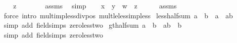\begin{isabellebody}
\ \ \isamarkupfalse%
\ {\isachardoublequoteopen}z\ {\isachargreater}{\kern0pt}\ {}{\isachardoublequoteclose}\isanewline
\ \ \ \ \isamarkupfalse%
\ assms\ \isamarkupfalse%
\ simp\isanewline
\ \ \isamarkupfalse%
\ {\isachardoublequoteopen}x\ {\isacharless}{\kern0pt}\ y\ {\isacharslash}{\kern0pt}\ w\ {\isacharasterisk}{\kern0pt}\ z{\isachardoublequoteclose}\isanewline
\ \ \ \ \isamarkupfalse%
\ assms\ \isamarkupfalse%
\ {\isacharparenleft}{\kern0pt}force\ intro{\isacharcolon}{\kern0pt}\ mult{\isacharunderscore}{\kern0pt}imp{\isacharunderscore}{\kern0pt}less{\isacharunderscore}{\kern0pt}div{\isacharunderscore}{\kern0pt}pos\ mult{\isacharunderscore}{\kern0pt}le{\isacharunderscore}{\kern0pt}less{\isacharunderscore}{\kern0pt}imp{\isacharunderscore}{\kern0pt}less{\isacharparenright}{\kern0pt}\isanewline
{}\isamarkupfalse%
%
\endisatagproof
{\isafoldproof}%
%
\isadelimproof
\isanewline
%
\endisadelimproof
\isanewline
{}\isamarkupfalse%
\ less{\isacharunderscore}{\kern0pt}half{\isacharunderscore}{\kern0pt}sum{\isacharcolon}{\kern0pt}\ {\isachardoublequoteopen}a\ {\isacharless}{\kern0pt}\ b\ {\isasymLongrightarrow}\ a\ {\isacharless}{\kern0pt}\ {\isacharparenleft}{\kern0pt}a{\isacharplus}{\kern0pt}b{\isacharparenright}{\kern0pt}\ {\isacharslash}{\kern0pt}\ {\isacharparenleft}{\kern0pt}{}{\isacharplus}{\kern0pt}{}{\isacharparenright}{\kern0pt}{\isachardoublequoteclose}\isanewline
%
\isadelimproof
\ \ %
\endisadelimproof
%
\isatagproof
{}\isamarkupfalse%
\ {\isacharparenleft}{\kern0pt}simp\ add{\isacharcolon}{\kern0pt}\ field{\isacharunderscore}{\kern0pt}simps\ zero{\isacharunderscore}{\kern0pt}less{\isacharunderscore}{\kern0pt}two{\isacharparenright}{\kern0pt}%
\endisatagproof
{\isafoldproof}%
%
\isadelimproof
\isanewline
%
\endisadelimproof
\isanewline
{}\isamarkupfalse%
\ gt{\isacharunderscore}{\kern0pt}half{\isacharunderscore}{\kern0pt}sum{\isacharcolon}{\kern0pt}\ {\isachardoublequoteopen}a\ {\isacharless}{\kern0pt}\ b\ {\isasymLongrightarrow}\ {\isacharparenleft}{\kern0pt}a{\isacharplus}{\kern0pt}b{\isacharparenright}{\kern0pt}{\isacharslash}{\kern0pt}{\isacharparenleft}{\kern0pt}{}{\isacharplus}{\kern0pt}{}{\isacharparenright}{\kern0pt}\ {\isacharless}{\kern0pt}\ b{\isachardoublequoteclose}\isanewline
%
\isadelimproof
\ \ %
\endisadelimproof
%
\isatagproof
{}\isamarkupfalse%
\ {\isacharparenleft}{\kern0pt}simp\ add{\isacharcolon}{\kern0pt}\ field{\isacharunderscore}{\kern0pt}simps\ zero{\isacharunderscore}{\kern0pt}less{\isacharunderscore}{\kern0pt}two{\isacharparenright}{\kern0pt}%

\end{isabellebody}
